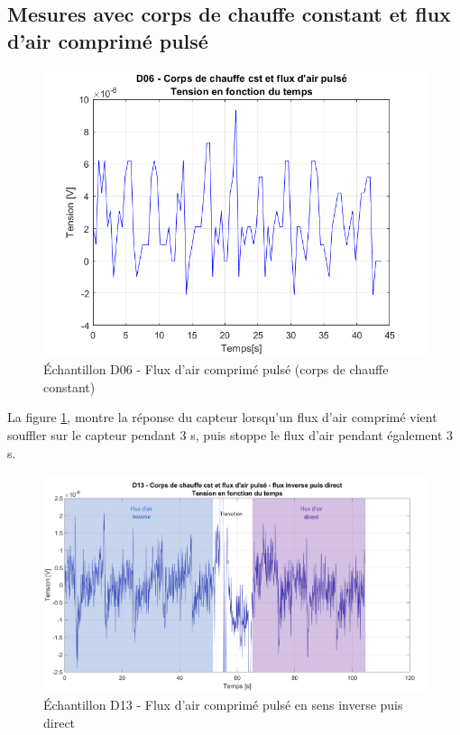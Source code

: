 \subsection{Mesures avec corps de chauffe constant et flux d'air comprimé pulsé}
\begin{figure}[H]
    \centering
    \includegraphics[scale = 0.5]{assets/figures/D06_air_comprime_pulse.png}
    \caption{Échantillon D06 - Flux d'air comprimé pulsé (corps de chauffe constant)}
    \label{fig:D06_airPulse}
\end{figure}
La figure \ref{fig:D06_airPulse}, montre la réponse du capteur lorsqu'un flux d'air comprimé vient souffler sur le capteur pendant 3 s, puis 
stoppe le flux d'air pendant également 3 s. 

\begin{figure}[H]
    \centering
    \includegraphics[scale = 0.6]{assets/figures/D13_air_comprime_pulse_blue.pdf}
    \caption{Échantillon D13 - Flux d'air comprimé pulsé en sens inverse puis direct}
    \label{fig:D13_air_comp_pulse}
\end{figure}

